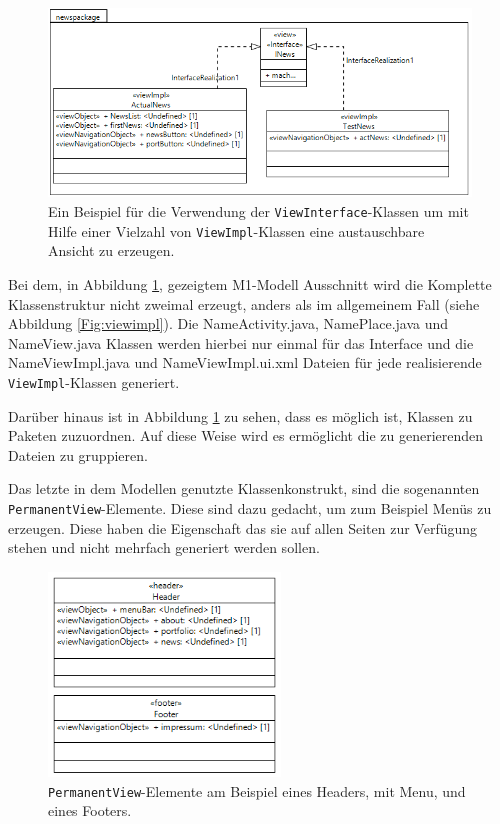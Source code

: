 \begin{figure}[htbp]
\begin{center}
\includegraphics[width=1.0\textwidth]{./img/GWT-Model-Views-interface.png}
\caption{Ein Beispiel für die Verwendung der \texttt{ViewInterface}-Klassen
um mit Hilfe einer Vielzahl von \texttt{ViewImpl}-Klassen
eine austauschbare Ansicht zu erzeugen.}\label{Fig:viewInterface}
\end{center}
\end{figure} 

Bei dem, in Abbildung \ref{Fig:viewInterface}, gezeigtem M1-Modell Ausschnitt
wird die Komplette Klassenstruktur nicht zweimal erzeugt, anders als im
allgemeinem Fall (siehe Abbildung \ref{Fig:viewimpl}). Die
\grqq{}Name\grqq{}Activity.java, \grqq{}Name\grqq{}Place.java und
\grqq{}Name\grqq{}View.java Klassen werden hierbei nur einmal für das Interface
und die \grqq{}Name\grqq{}ViewImpl.java und \grqq{}Name\grqq{}ViewImpl.ui.xml
Dateien für jede realisierende \texttt{ViewImpl}-Klassen generiert. 

Darüber hinaus ist in Abbildung \ref{Fig:viewInterface} zu sehen, dass es
möglich ist, Klassen zu Paketen zuzuordnen. Auf diese Weise wird es
ermöglicht die zu generierenden Dateien zu gruppieren. 

\newpage
Das letzte in dem Modellen genutzte Klassenkonstrukt, sind die sogenannten
\texttt{PermanentView}-Elemente. Diese sind dazu gedacht, um zum Beispiel Menüs
zu erzeugen. Diese haben die Eigenschaft das sie auf allen Seiten zur Verfügung
stehen und nicht mehrfach generiert werden sollen.

\begin{figure}[htbp]
\begin{center}
\includegraphics[width=0.55\textwidth]{./img/Header_Footer.png}
\caption{\texttt{PermanentView}-Elemente am Beispiel
eines Headers, mit Menu, und eines Footers.}\label{Fig:headerFooter}
\end{center}
\end{figure} 

